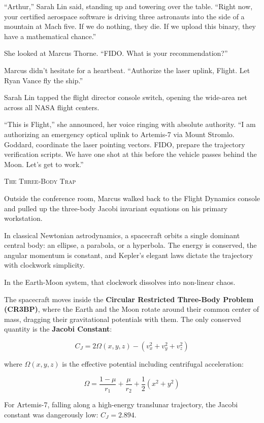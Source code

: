 \documentclass[12pt,twoside,openright]{book}
\newcommand{\sceneheader}[1]{%
  \par\vspace{1.8em}%
  {\noindent\centering\scshape\large #1\par}%
  \vspace{1.0em}%
  \noindent%
}
\newcommand{\dinkus}{%
  \par\vspace{1.2em}%
  {\noindent\centering{\large $\ast\quad\ast\quad\ast$}\par}%
  \vspace{1.2em}%
  \noindent%
}
\begin{document}
``Arthur,'' Sarah Lin said, standing up and towering over the table.
``Right now, your certified aerospace software is driving three
astronauts into the side of a mountain at Mach five. If we do nothing,
they die. If we upload this binary, they have a mathematical chance.''

She looked at Marcus Thorne. ``FIDO. What is your recommendation?''

Marcus didn't hesitate for a heartbeat. ``Authorize the laser uplink,
Flight. Let Ryan Vance fly the ship.''

Sarah Lin tapped the flight director console switch, opening the
wide-area net across all NASA flight centers.

``This is Flight,'' she announced, her voice ringing with absolute
authority. ``I am authorizing an emergency optical uplink to Artemis-7
via Mount Stromlo. Goddard, coordinate the laser pointing vectors. FIDO,
prepare the trajectory verification scripts. We have one shot at this
before the vehicle passes behind the Moon. Let's get to work.''

\dinkus

\sceneheader{The Three-Body Trap}

Outside the conference room, Marcus walked back to the Flight Dynamics
console and pulled up the three-body Jacobi invariant equations on his
primary workstation.

In classical Newtonian astrodynamics, a spacecraft orbits a single
dominant central body: an ellipse, a parabola, or a hyperbola. The
energy is conserved, the angular momentum is constant, and Kepler's
elegant laws dictate the trajectory with clockwork simplicity.

In the Earth-Moon system, that clockwork dissolves into non-linear
chaos.

The spacecraft moves inside the \textbf{Circular Restricted Three-Body
Problem (CR3BP)}, where the Earth and the Moon rotate around their
common center of mass, dragging their gravitational potentials with
them. The only conserved quantity is the \textbf{Jacobi Constant}:

\[C_J = 2 \Omega(x, y, z) - (v_x^2 + v_y^2 + v_z^2)\]

where \(\Omega(x, y, z)\) is the effective potential including
centrifugal acceleration:

\[\Omega = \frac{1-\mu}{r_1} + \frac{\mu}{r_2} + \frac{1}{2}(x^2 + y^2)\]

For Artemis-7, falling along a high-energy translunar trajectory, the
Jacobi constant was dangerously low: \(C_J = 2.894\).
\end{document}

